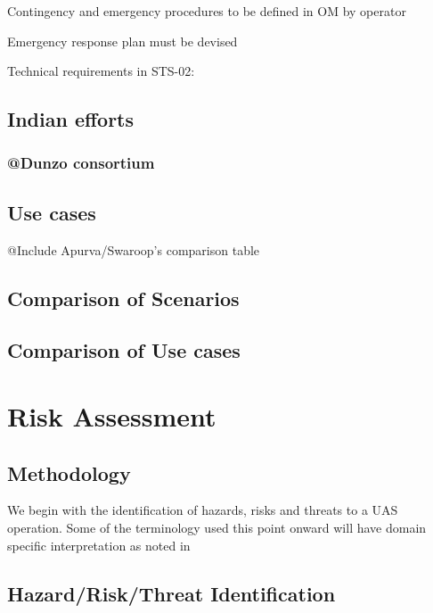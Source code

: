 \documentclass{ua_wgs_base}
\begin{document}
Contingency and emergency procedures to be defined in OM by operator

Emergency response plan must be devised 

Technical requirements in STS-02:

\section{Indian efforts}

\subsection{@Dunzo consortium}

\section{Use cases}

\begin{lyxgreyedout}
@Include Apurva/Swaroop's comparison table%
\end{lyxgreyedout}


\section{Comparison of Scenarios}

\section{Comparison of Use cases}

\cleardoublepage{}

\chapter{Risk Assessment}

\section{Methodology}

We begin with the identification of hazards, risks and threats to
a UAS operation. Some of the terminology used this point onward will
have domain specific interpretation as noted in 

\section{Hazard/Risk/Threat Identification}
\end{document}
